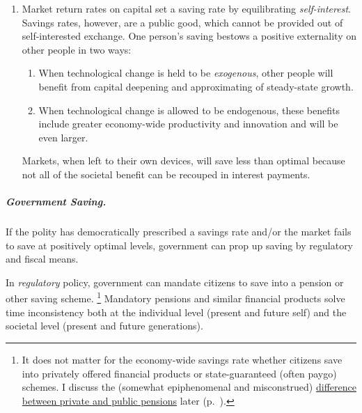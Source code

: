 \begin{enumerate}
	\item Market return rates on capital set a saving rate by equilibrating \emph{self-interest}.
	Savings rates, however, are a public good, which cannot be provided out of self-interested exchange.
	One person's saving  bestows a positive externality on other people in two ways:

	\begin{enumerate}
		\item When technological change is held to be \emph{exogenous}, other people will benefit from capital deepening and approximating of steady-state growth.
		\item When technological change is allowed to be endogenous, these benefits include greater economy-wide productivity and innovation and will be even larger.
	\end{enumerate}

	Markets, when left to their own devices, will save less than optimal because not all of the societal benefit can be recouped in interest payments.
\end{enumerate}

\subparagraph{Government Saving.}
	\label{sec:government-saves}
If the polity has democratically prescribed a savings rate and/or the market fails to save at positively optimal levels, government can prop up saving by regulatory and fiscal means.

In \emph{regulatory} policy, government can mandate citizens to save into a pension or other saving scheme.
\footnote{
	It does not matter for the economy-wide savings rate whether citizens save into privately offered financial products or state-guaranteed (often \gls{paygo}) schemes.
	I discuss the (somewhat epiphenomenal and misconstrued) \hyperref[sec:pensions]{difference between private and public pensions} later (p.~\pageref{sec:pensions}).
}
Mandatory pensions and similar financial products solve time inconsistency both at the individual level (present and future self) and the societal level (present and future generations).

